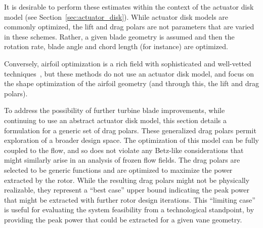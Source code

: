 It is desirable to perform these estimates within the context of the
actuator disk model (see Section~\ref{sec:actuator_disk}). While
actuator disk models are commonly
optimized\cite{790585,WE:WE487,en5093425,adkins1983design}, the lift and 
drag polars are not parameters that are varied in these schemes. Rather,
a given blade geometry is assumed and then the rotation rate, blade
angle and chord length (for instance) are optimized.   

Conversely, airfoil optimization is a rich field with sophisticated and
well-vetted
techniques~\cite{drela1998pros,lewis2001aerodynamic,Chehouri2015361},
but these methods do not use an actuator disk model, and focus on the
shape optimization of the airfoil geometry (and through this, the lift
and drag polars).  

To address the possibility of further turbine blade
improvements, while continuing to use an abstract actuator disk model,
this section details a formulation for a generic set of drag 
polars. These generalized drag polars permit exploration of a broader
design space. The optimization of this model can be fully coupled to the
flow, and so does not violate any Betz-like considerations that might
similarly arise in an analysis of frozen flow fields.
The drag polars are selected to be generic functions and are optimized to
maximize the power extracted by the rotor. While the resulting drag
polars might not be physically  realizable, they represent a ``best
case'' upper bound indicating the peak power that might be extracted
with further rotor design iterations. This ``limiting case'' is useful
for evaluating the system feasibility from a technological standpoint,
by providing the peak power that could be extracted for a given vane
geometry. 

